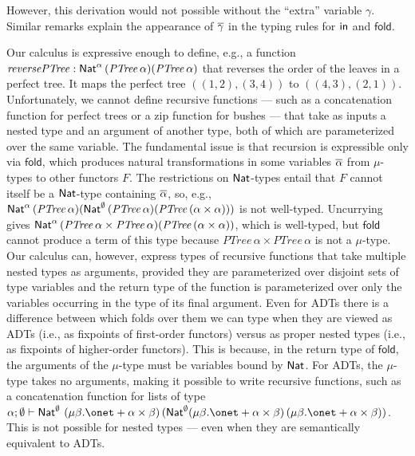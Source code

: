 \documentclass[runningheads]{llncs}
\begin{document}
\pagebreak

\noindent
However, this derivation would not possible without the ``extra''
variable $\gamma$.  Similar remarks explain the appearance of $\overline{\gamma}$ in the typing rules for $\mathsf{in}$ and $\mathsf{fold}$.

Our calculus is expressive enough to define, e.g., a function
$\mathit{reversePTree}: \mathsf{Nat}^\alpha \, (\mathit{PTree}\,\alpha)
(\mathit{PTree}\,\alpha)$ that reverses the order of the leaves in a
perfect tree. It maps the perfect tree $((1, 2), (3, 4))$ to $((4, 3),
(2, 1))$.  Unfortunately, we cannot define recursive functions ---
such as a concatenation function for perfect trees or a zip function
for bushes --- that take as inputs a nested type and an argument of
another type, both of which are parameterized over the same
variable. The fundamental issue is that recursion is expressible only
via $\mathsf{fold}$, which produces natural transformations in some
variables $\overline{\alpha}$ from $\mu$-types to other functors $F$. The
restrictions on $\mathsf{Nat}$-types entail that $F$ cannot itself be a
$\mathsf{Nat}$-type containing $\overline{\alpha}$, so, e.g., $\mathsf{Nat}^\alpha \,
(\mathit{PTree}\,\alpha) (\mathsf{Nat}^\emptyset \, (\mathit{PTree}\,\alpha)
(\mathit{PTree}\,(\alpha \times \alpha)))$ is not well-typed.
Uncurrying gives $\mathsf{Nat}^\alpha \, (\mathit{PTree}\,\alpha \times
\mathit{PTree}\,\alpha) (\mathit{PTree}\,(\alpha \times \alpha))$,
which is well-typed, but $\mathsf{fold}$ cannot produce a term of this
type because $\mathit{PTree}\,\alpha \times \mathit{PTree}\,\alpha$ is
not a $\mu$-type.  Our calculus can, however, express types of
recursive functions that take multiple nested types as arguments,
provided they are parameterized over disjoint sets of type variables
and the return type of the function is parameterized over only the
variables occurring in the type of its final argument.  Even for ADTs
there is a difference between which folds over them we can type when
they are viewed as ADTs (i.e., as fixpoints of first-order functors)
versus as proper nested types (i.e., as fixpoints of higher-order
functors). This is because, in the return type of $\mathsf{fold}$, the
arguments of the $\mu$-type must be variables bound by $\mathsf{Nat}$.  For
ADTs, the $\mu$-type takes no arguments, making it possible to write
recursive functions, such as a concatenation function for lists of
type $\alpha ; \emptyset \vdash \Nat^\emptyset \ (\mu \beta. \onet +
\alpha \times \beta)\, (\Nat^\emptyset (\mu \beta. \onet + \alpha
\times \beta) \, (\mu \beta. \onet + \alpha \times \beta))$.  This is
not possible for nested types --- even when they are semantically
equivalent to ADTs.
\end{document}
